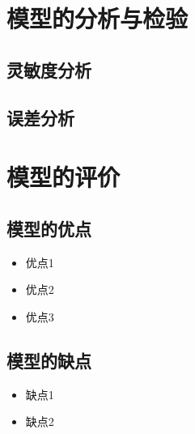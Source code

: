 \documentclass[withoutpreface,bwprint]{cumcmthesis}
\begin{document}

\section{模型的分析与检验}

\subsection{灵敏度分析}

\subsection{误差分析}


\section{模型的评价}

\subsection{模型的优点}
\begin{itemize}[itemindent=2em]
\item 优点1
\item 优点2
\item 优点3
\end{itemize}

\subsection{模型的缺点}
\begin{itemize}[itemindent=2em]
\item 缺点1
\item 缺点2
\end{itemize}

\nocite{*}
\end{document}
